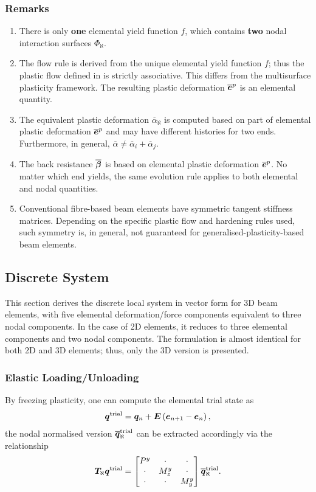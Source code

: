 \subsubsection{Remarks}
\begin{enumerate}
\item There is only \textbf{one} elemental yield function $f$, which contains \textbf{two} nodal interaction surfaces $\Phi_\aleph$.
\item The flow rule is derived from the unique elemental yield function $f$; thus the plastic flow defined in  is strictly associative.
This differs from the multisurface plasticity framework.
The resulting plastic deformation $\overline{\bm{e}}^p$ is an elemental quantity.
\item The equivalent plastic deformation $\overline{\alpha}_\aleph$ is computed based on part of elemental plastic deformation $\overline{\bm{e}}^p$ and may have different histories for two ends.
Furthermore, in general, $\overline{\alpha}\neq\overline{\alpha}_i+\overline{\alpha}_j$.
\item The back resistance $\overline{\bm{\beta}}$ is based on elemental plastic deformation $\overline{\bm{e}}^p$.
No matter which end yields, the same evolution rule applies to both elemental and nodal quantities.
\item Conventional fibre-based beam elements have symmetric tangent stiffness matrices.
Depending on the specific plastic flow and hardening rules used, such symmetry is, in general, not guaranteed for generalised-plasticity-based beam elements.
\end{enumerate}
\subsection{Discrete System}
This section derives the discrete local system in vector form for 3D beam elements, with five elemental deformation/force components equivalent to three nodal components.
In the case of 2D elements, it reduces to three elemental components and two nodal components.
The formulation is almost identical for both 2D and 3D elements; thus, only the 3D version is presented.
\subsubsection{Elastic Loading/Unloading}
By freezing plasticity, one can compute the elemental trial state as
\begin{gather}\label{eq:nm_qa}
\bm{q}^\text{trial}=\bm{q}_n+\bm{E}\left(\bm{e}_{n+1}-\bm{e}_n\right),
\end{gather}
the nodal normalised version $\bm{\overline{q}}_\aleph^\text{trial}$ can be extracted accordingly via the relationship
\begin{gather}\label{eq:nm_qb}
\bm{T}_\aleph\bm{q}^\text{trial}=\begin{bmatrix}
P^y&\cdot&\cdot\\\cdot&M_z^y&\cdot\\\cdot&\cdot&M_y^y
\end{bmatrix}\bm{\overline{q}}_\aleph^\text{trial}.
\end{gather}


